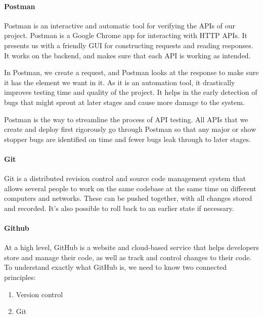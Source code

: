 \paragraph{Postman}
Postman is an interactive and automatic tool for verifying the APIs of our project. Postman is a Google Chrome app for interacting with HTTP APIs. It presents us with a friendly GUI for constructing requests and reading responses. It works on the backend, and makes sure that each API is working as intended.

In Postman, we create a request, and Postman looks at the response to make sure it has the element we want in it. As it is an automation tool, it drastically improves testing time and quality of the project. It helps in the early detection of bugs that might sprout at later stages and cause more damage to the system.

Postman is the way to streamline the process of API testing. All APIs that we create and deploy first rigorously go through Postman so that any major or show stopper bugs are identified on time and fewer bugs leak through to later stages.



\paragraph{Git}
Git is a distributed revision control and source code management system that
allows several people to work on the same codebase at the same time on different
computers and networks. These can be pushed together, with all changes stored and
recorded. It’s also possible to roll back to an earlier state if necessary.
\paragraph{Github}
At a high level, GitHub is a website and cloud-based service that helps developers store and manage their code, as well as track and control changes to their code. To understand exactly what GitHub is, we need to know two connected principles:
\begin{enumerate}
      \item Version control
      \item Git
\end{enumerate}

